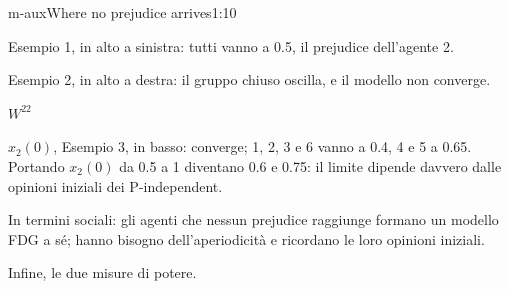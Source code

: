 \begin{slidedue}{m-aux}{Where no prejudice arrives}{1:10}
\begin{discorso}
    \item {\color{blue}\clic Esempio 1, in alto a sinistra: tutti vanno a 0.5, il prejudice dell'agente 2.}
    \item {\color{blue}Esempio 2, in alto a destra: il gruppo chiuso oscilla, e il modello non converge.}
    \item {\color{red}       } {\color{red}$W^{22}$} {\color{red}                          }
    \item {\color{red}    } {\color{red}$x_2(0)$,} {\color{blue}Esempio 3, in basso: converge; 1, 2, 3 e 6 vanno a 0.4, 4 e 5 a 0.65. Portando $x_2(0)$} da 0.5 a {\color{red}  } {\color{blue}1} diventano 0.6 e {\color{red} } {\color{blue}0.75: il} limite dipende {\color{blue}davvero} dalle opinioni iniziali dei P-independent.
    \item In termini sociali: gli agenti che nessun {\color{red}} {\color{blue}prejudice} raggiunge formano un modello FDG a sé; hanno bisogno dell'aperiodicità e ricordano le loro opinioni iniziali.
    \item Infine, le due misure di potere.
  \end{discorso}
\end{slidedue}

